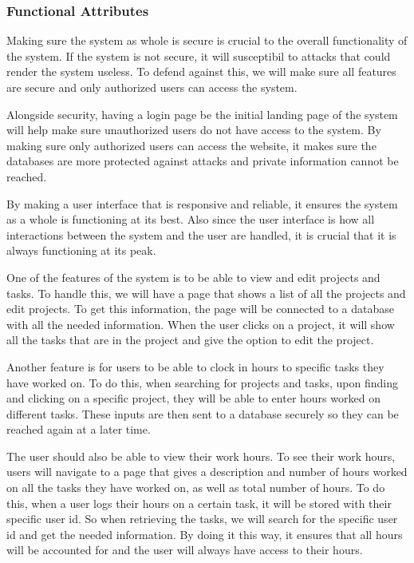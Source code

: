 \documentclass[letterpaper,10pt,titlepage,journal,compsoc,draftclsnofoot,onecolumn]{IEEEtran}
\begin{document}
\subsubsection{Functional Attributes}

Making sure the system as whole is secure is crucial to the overall functionality of the system. If the system is not secure, it will susceptibil to attacks that could render the system useless. To defend against this, we will make sure all features are secure and only authorized users can access the system.  


Alongside security, having a login page be the initial landing page of the system will help make sure unauthorized users do not have access to the system. By making sure only authorized users can access the website, it makes sure the databases are more protected against attacks and private information cannot be reached. 


By making a user interface that is responsive and reliable, it ensures the system as a whole is functioning at its best. Also since the user interface is how all interactions between the system and the user are handled, it is crucial that it is always functioning at its peak. 


One of the features of the system is to be able to view and edit projects and tasks. To handle this, we will have a page that shows a list of all the projects and edit projects. To get this information, the page will be connected to a database with all the needed information. When the user clicks on a project, it will show all the tasks that are in the project and give the option to edit the project. 


Another feature is for users to be able to clock in hours to specific tasks they have worked on. To do this, when searching for projects and tasks, upon finding and clicking on a specific project, they will be able to enter hours worked on different tasks. These inputs are then sent to a database securely so they can be reached again at a later time. 


The user should also be able to view their work hours. To see their work hours, users will navigate to a page that gives a description and number of hours worked on all the tasks they have worked on, as well as total number of hours. To do this, when a user logs their hours on a certain task, it will be stored with their specific user id. So when retrieving the tasks, we will search for the specific user id and get the needed information. By doing it this way, it ensures that all hours will be accounted for and the user will always have access to their hours. 
\end{document}
